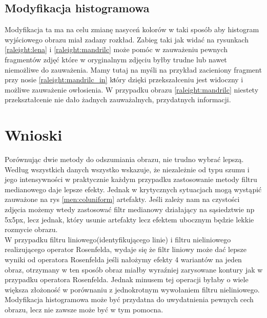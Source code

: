 \documentclass{classrep}
\begin{document}
\subsection{Modyfikacja histogramowa}

Modyfikacja ta ma na celu zmianę nasyceń kolorów w taki sposób aby histogram wyjściowego obrazu miał zadany rozkład. Zabieg taki jak widać na rysunkach \ref{raleight:lena} i \ref{raleight:mandrilc} może pomóc w zauważeniu pewnych fragmentów zdjęć które w oryginalnym zdjęciu byłby trudne lub nawet niemożliwe do zauważenia. Mamy tutaj na myśli na przykład zacieniony fragment przy nosie \ref{raleight:mandrilc_in} kŧóry dzięki przekszałceniu jest widoczny i możliwe zauważenie owłosienia. W przypadku obrazu \ref{raleight:mandrilc} niestety przekształcenie nie dało żadnych zauważalnych, przydatnych informacji.


\section{Wnioski}
Porównując dwie metody do odszumiania obrazu, nie trudno wybrać lepszą. Według wszystkich danych wszystko wskazuje, że niezależnie od typu szumu i jego intensywności w praktycznie każdym przypadku zastosowanie metody filtru medianowego daje lepsze efekty. Jednak w krytycznych sytuacjach mogą wystąpić zauważone na rys \ref{men:coluniform} artefakty. Jeśli zależy nam na czystości zdjęcia możemy wtedy zastosować filtr medianowy działający na sąsiedztwie np 5x5px, lecz jednak, który usunie artefakty lecz efektem ubocznym będzie lekkie rozmycie obrazu.
\\W przypadku filtru liniowego(identyfikującego linie) i filtru nieliniowego realizującego operator Rosenfelda, wydaje się że filtr liniowy może dać lepsze wyniki od operatora Rosenfelda jeśli nałożymy efekty 4 wariantów na jeden obraz, otrzymany w ten sposób obraz miałby wyraźniej zarysowane kontury jak w przypadku operatora Rosenfelda. Jednak minusem tej operacji byłaby o wiele większa złożoność w porównaniu z jednokrotnym wywołaniem filtru nieliniowego.
\\Modyfikacja histogramowa może być przydatna do uwydatnienia pewnych cech obrazu, lecz nie zawsze może być w tym pomocna.

\begin{thebibliography}{8}

\end{thebibliography}
\end{document}
